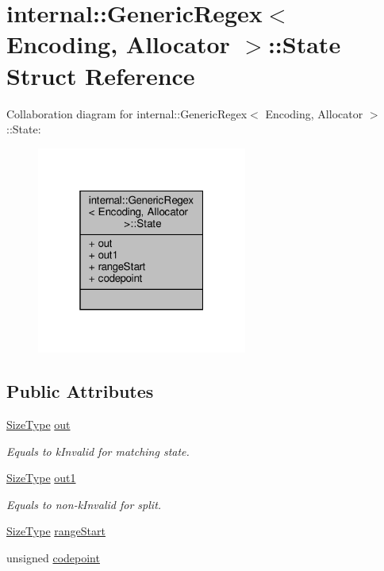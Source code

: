 \hypertarget{structinternal_1_1GenericRegex_1_1State}{}\section{internal\+:\+:Generic\+Regex$<$ Encoding, Allocator $>$\+:\+:State Struct Reference}
\label{structinternal_1_1GenericRegex_1_1State}


Collaboration diagram for internal\+:\+:Generic\+Regex$<$ Encoding, Allocator $>$\+:\+:State\+:
\nopagebreak
\begin{figure}[H]
\begin{center}
\leavevmode
\includegraphics[width=196pt]{structinternal_1_1GenericRegex_1_1State__coll__graph}
\end{center}
\end{figure}
\subsection*{Public Attributes}
\begin{DoxyCompactItemize}
\item 
\hyperlink{rapidjson_8h_a5ed6e6e67250fadbd041127e6386dcb5}{Size\+Type} \hyperlink{structinternal_1_1GenericRegex_1_1State_a2db0ecd5296137b4e27a8bdb9b9b3a36}{out}
\begin{DoxyCompactList}\small\item\em Equals to k\+Invalid for matching state. \end{DoxyCompactList}\item 
\hyperlink{rapidjson_8h_a5ed6e6e67250fadbd041127e6386dcb5}{Size\+Type} \hyperlink{structinternal_1_1GenericRegex_1_1State_a018baa62233a52e87df7dac21dcfefc7}{out1}
\begin{DoxyCompactList}\small\item\em Equals to non-\/k\+Invalid for split. \end{DoxyCompactList}\item 
\hyperlink{rapidjson_8h_a5ed6e6e67250fadbd041127e6386dcb5}{Size\+Type} \hyperlink{structinternal_1_1GenericRegex_1_1State_a4f994da3eb09d3d86ad7dbfec4dd5c1c}{range\+Start}
\item 
unsigned \hyperlink{structinternal_1_1GenericRegex_1_1State_ab085a481f7a18c4a70d4cc534a72a23e}{codepoint}
\end{DoxyCompactItemize}


